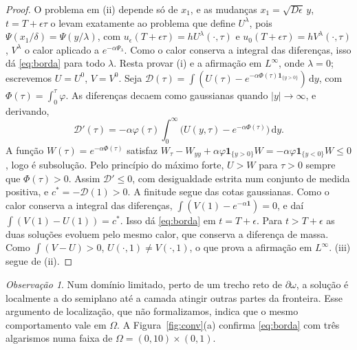\documentclass[11pt,a4paper]{article}
\numberwithin{equation}{section}
\theoremstyle{definition}
\theoremstyle{remark}
\newtheorem{observacao}[teorema]{Observação}
\newcommand{\dd}{\,\mathrm{d}}
\begin{document}
\begin{proof}
O problema em (ii) depende só de $x_1$, e as mudanças $x_1=\sqrt{D\epsilon}\,y$,
$t=T+\epsilon\tau$ o levam exatamente ao problema que define $U^\lambda$, pois
$\Psi(x_1/\delta)=\Psi(y/\lambda)$, com $u_\epsilon(T+\epsilon\tau)=hU^\lambda(\cdot,\tau)$ e
$u_0(T+\epsilon\tau)=hV^\lambda(\cdot,\tau)$, $V^\lambda$ o calor aplicado a $e^{-\alpha\Psi_\lambda}$.
Como o calor conserva a integral das diferenças, isso dá \eqref{eq:borda} para todo $\lambda$. Resta
provar (i) e a afirmação em $L^\infty$, onde $\lambda=0$; escrevemos $U=U^0$, $V=V^0$. Seja
$\mathcal D(\tau)=\int(U(\tau)-e^{-\alpha\Phi(\tau)\mathbf 1_{\{y>0\}}})\dd y$, com
$\Phi(\tau)=\int_0^\tau\varphi$. As diferenças decaem como gaussianas quando $|y|\to\infty$, e
derivando,
\[
\mathcal D'(\tau)=-\alpha\varphi(\tau)\int_0^\infty\big(U(y,\tau)-e^{-\alpha\Phi(\tau)}\big)\dd y .
\]
A função $W(\tau)=e^{-\alpha\Phi(\tau)}$ satisfaz
$W_\tau-W_{yy}+\alpha\varphi\mathbf 1_{\{y>0\}}W=-\alpha\varphi\mathbf 1_{\{y<0\}}W\le0$, logo é
subsolução. Pelo princípio do máximo forte, $U>W$ para $\tau>0$ sempre que $\Phi(\tau)>0$. Assim
$\mathcal D'\le0$, com desigualdade estrita num conjunto de medida positiva, e
$c^*=-\mathcal D(1)>0$. A finitude segue das cotas gaussianas. Como o calor conserva a integral
das diferenças, $\int(V(1)-e^{-\alpha\mathbf 1})=0$, e daí $\int(V(1)-U(1))=c^*$. Isso dá
\eqref{eq:borda} em $t=T+\epsilon$. Para $t>T+\epsilon$ as duas soluções evoluem pelo mesmo calor, que
conserva a diferença de massa. Como $\int(V-U)>0$, $U(\cdot,1)\ne V(\cdot,1)$, o que prova a afirmação
em $L^\infty$. (iii) segue de (ii).
\end{proof}

\begin{observacao}
Num domínio limitado, perto de um trecho reto de $\partial\omega$, a solução é localmente a do
semiplano até a camada atingir outras partes da fronteira. Esse argumento de localização, que
não formalizamos, indica que o mesmo comportamento vale em $\Omega$. A Figura~\ref{fig:conv}(a)
confirma \eqref{eq:borda} com três algarismos numa faixa de $\Omega=(0,10)\times(0,1)$.
\end{observacao}
\end{document}
